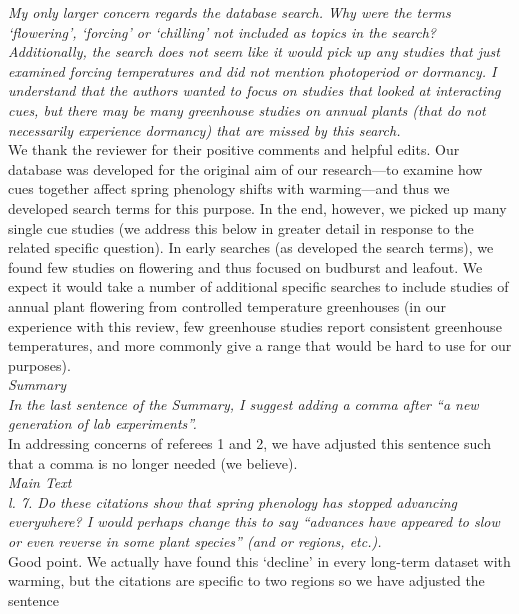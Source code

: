 \documentclass[11pt,letter]{article}
\begin{document}
\emph{My only larger concern regards the database search. Why were the terms `flowering', `forcing' or `chilling' not included as topics in the search? Additionally, the search does not seem like it would pick up any studies that just examined forcing temperatures and did not mention photoperiod or dormancy. I understand that the authors wanted to focus on studies that looked at interacting cues, but there may be many greenhouse studies on annual plants (that do not necessarily experience dormancy) that are missed by this search. }\\

We thank the reviewer for their positive comments and helpful edits. Our database was developed for the original aim of our research---to examine how cues together affect spring phenology shifts with warming---and thus we developed search terms for this purpose. In the end, however, we picked up many single cue studies (we address this below in greater detail in response to the related specific question). In early searches (as developed the search terms), we found few studies on flowering and thus focused on budburst and leafout. We expect it would take a number of additional specific searches to include studies of annual plant flowering from controlled temperature greenhouses (in our experience with this review, few greenhouse studies report consistent greenhouse temperatures, and more commonly give a range that would be hard to use for our purposes). \\

\emph{Summary }\\

\emph{In the last sentence of the Summary, I suggest adding a comma after “a new generation of lab experiments”. }\\

In addressing concerns of referees 1 and 2, we have adjusted this sentence such that a comma is no longer needed (we believe).\\

\emph{Main Text }\\

\emph{l. 7. Do these citations show that spring phenology has stopped advancing everywhere? I would perhaps change this to say “advances have appeared to slow or even reverse in some plant species” (and or regions, etc.). }\\

Good point. We actually have found this `decline' in every long-term dataset with warming, but the citations are specific to two regions so we have adjusted the sentence\\
\end{document}
